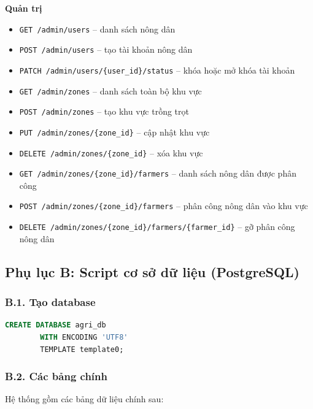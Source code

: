 \documentclass[13pt,a4paper]{extarticle}
\numberwithin{figure}{section}
\numberwithin{table}{section}
\begin{document}
	\noindent
	\textbf{Quản trị}
	\begin{itemize}
		\item \texttt{GET /admin/users} -- danh sách nông dân
		\item \texttt{POST /admin/users} -- tạo tài khoản nông dân
		\item \texttt{PATCH /admin/users/\{user\_id\}/status} -- khóa hoặc mở khóa tài khoản
		\item \texttt{GET /admin/zones} -- danh sách toàn bộ khu vực
		\item \texttt{POST /admin/zones} -- tạo khu vực trồng trọt
		\item \texttt{PUT /admin/zones/\{zone\_id\}} -- cập nhật khu vực
		\item \texttt{DELETE /admin/zones/\{zone\_id\}} -- xóa khu vực
		\item \texttt{GET /admin/zones/\{zone\_id\}/farmers} -- danh sách nông dân được phân công
		\item \texttt{POST /admin/zones/\{zone\_id\}/farmers} -- phân công nông dân vào khu vực
		\item \texttt{DELETE /admin/zones/\{zone\_id\}/farmers/\{farmer\_id\}} -- gỡ phân công nông dân
	\end{itemize}
	
	\subsection*{Phụ lục B: Script cơ sở dữ liệu (PostgreSQL)}
	
	\subsubsection*{B.1. Tạo database}
	
	\noindent
	\begin{lstlisting}[language=SQL]
		CREATE DATABASE agri_db
		WITH ENCODING 'UTF8'
		TEMPLATE template0;
	\end{lstlisting}
	
	\subsubsection*{B.2. Các bảng chính}
	
	\noindent
	Hệ thống gồm các bảng dữ liệu chính sau:
	
\end{document}
